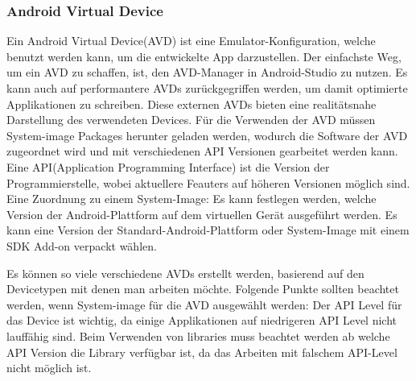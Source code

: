 \subsubsection{Android Virtual Device}
Ein Android Virtual Device(AVD) ist eine Emulator-Konfiguration, welche benutzt werden kann, um die entwickelte App darzustellen. 
Der einfachste Weg, um ein AVD zu schaffen, ist, den AVD-Manager in Android-Studio zu nutzen. 
Es kann auch auf performantere AVDs zurückgegriffen werden, um damit optimierte Applikationen zu schreiben.
Diese externen AVDs bieten eine realitätsnahe Darstellung des verwendeten Devices.
Für die Verwenden der AVD müssen System-image Packages herunter geladen werden, wodurch die Software der AVD zugeordnet wird und mit verschiedenen API Versionen gearbeitet werden kann.
Eine API(Application Programming Interface) ist die Version der Programmierstelle, wobei aktuellere Feauters auf höheren Versionen möglich sind. 
Eine Zuordnung zu einem System-Image: Es kann festlegen werden, welche Version der Android-Plattform auf dem virtuellen Gerät ausgeführt werden. Es kann eine Version der Standard-Android-Plattform oder System-Image mit einem SDK Add-on verpackt wählen.

Es können so viele verschiedene AVDs erstellt werden, basierend auf den Devicetypen mit denen man arbeiten möchte.
Folgende Punkte sollten beachtet werden, wenn System-image für die AVD ausgewählt werden:
Der API Level für das Device ist wichtig, da einige Applikationen auf niedrigeren API Level nicht lauffähig sind. Beim Verwenden von libraries muss beachtet werden ab welche API Version die Library verfügbar ist, da das Arbeiten mit falschem API-Level nicht möglich ist.


